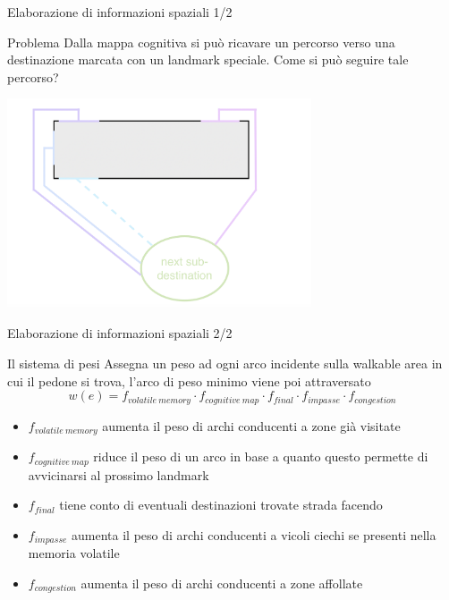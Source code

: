 \documentclass{beamer}
\begin{document}
\begin{frame}{Elaborazione di informazioni spaziali 1/2}
\begin{alertblock}{Problema}
Dalla mappa cognitiva si può ricavare un percorso verso una destinazione marcata con un landmark speciale. Come si può seguire tale percorso?
\end{alertblock}{}
\hfil\hfil\includegraphics[width=9cm]{figures/polygonal-chains-to-subdestination.png}

\end{frame}{}

\begin{frame}{Elaborazione di informazioni spaziali 2/2}
\begin{block}{Il sistema di pesi}
Assegna un peso ad ogni arco incidente sulla walkable area in cui il pedone si trova, l'arco di peso minimo viene poi attraversato
\begin{equation}
    w(e) = f_{volatile\ memory}\cdot f_{cognitive\ map}\cdot f_{final}\cdot f_{impasse}\cdot f_{congestion}
\end{equation}{}
\begin{itemize}
    \item \(f_{volatile\ memory}\) aumenta il peso di archi conducenti a zone già visitate
    \item \(f_{cognitive\ map}\) riduce il peso di un arco in base a quanto questo permette di avvicinarsi al prossimo landmark
    \item \(f_{final}\) tiene conto di eventuali destinazioni trovate strada facendo
    \item \textcolor{bostonuniversityred}{\(f_{impasse}\)} aumenta il peso di archi conducenti a vicoli ciechi se presenti nella memoria volatile
    \item \textcolor{bostonuniversityred}{\(f_{congestion}\)} aumenta il peso di archi conducenti a zone affollate
\end{itemize}
\end{block}
\end{frame}
\end{document}
